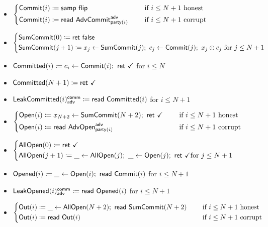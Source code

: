\begin{itemize}
\item {\color{blue} $\begin{cases*} \Commit(i) \coloneqq \samp{\flip} & \hspace{10pt} \text{if $i \leq N+1$ honest} \\ \Commit(i) \coloneqq \read{\AdvCommit^\adv_{\party(i)}} & \hspace{10pt} \text{if $i \leq N+1$ corrupt} \end{cases*}$}
\item {\color{blue} $\begin{cases*} \SumCommit(0) \coloneqq \ret{\false} \\ \SumCommit(j+1) \coloneqq x_j \leftarrow \SumCommit(j); \ c_j \leftarrow \Commit(j); \ x_j \oplus c_j \text{ for $j \leq N+1$} \end{cases*}$}
\item {\color{magenta} $\mathsf{Committed}(i) \coloneqq c_i \leftarrow \mathsf{Commit}(i); \ \mathsf{ret} \ \checkmark$ for $i \leq N$}
\item {\color{magenta} $\mathsf{Committed}(N+1) \coloneqq \mathsf{ret} \ \checkmark$}
\item {\color{magenta} $\mathsf{LeakCommitted}(i)^{\mathsf{comm}}_{\mathsf{adv}} \coloneqq \mathsf{read} \ \mathsf{Committed}(i)$ for $i \leq N+1$}
\item {\color{teal} $\begin{cases*} \Open(i) \coloneqq x_{N+2} \leftarrow \SumCommit(N+2); \ \ret{\checkmark} & \hspace{10pt} \text{if $i \leq N+1$ honest} \\ \Open(i) \coloneqq \read{\AdvOpen^\adv_{\party(i)}} & \hspace{10pt} \text{if $i \leq N+1$ corrupt} \end{cases*}$}
\item {\color{teal} $\begin{cases*} \AllOpen(0) \coloneqq \ret{\checkmark} \\ \AllOpen(j+1) \coloneqq \_ \leftarrow \AllOpen(j); \ \_ \leftarrow \Open(j); \ \ret{\checkmark} \text{for $j \leq N+1$} \end{cases*}$}
\item {\color{red} $\mathsf{Opened}(i) \coloneqq \_ \leftarrow \mathsf{Open}(i); \ \mathsf{read} \ \mathsf{Commit}(i)$ for $i \leq N+1$}
\item {\color{red} $\mathsf{LeakOpened}(i)^{\mathsf{comm}}_{\mathsf{adv}} \coloneqq \mathsf{read} \ \mathsf{Opened}(i)$ for $i \leq N+1$}
\item $\begin{cases*} \Out(i) \coloneqq \_ \leftarrow \AllOpen(N+2); \ \read{\SumCommit(N+2)} & \hspace{10pt} \text{if $i \leq N+1$ honest} \\ \Out(i) \coloneqq \read{\Out(i)} & \hspace{10pt} \text{if $i \leq N+1$ corrupt} \end{cases*}$
\end{itemize}

